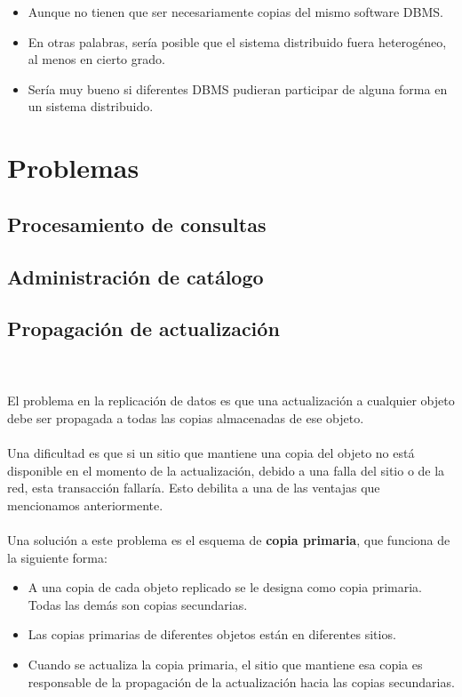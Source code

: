 \documentclass[10pt,a4paper,oneside]{article}
\begin{document}
\begin {itemize}
\begin{itemize}
\item Aunque no tienen que ser necesariamente copias del mismo software DBMS.
\item En otras palabras, ser\'ia posible que el sistema distribuido fuera heterog\'eneo, al menos en cierto grado.
\item Ser\'ia muy bueno si diferentes DBMS pudieran participar de alguna forma en un sistema distribuido. 
\end{itemize}


\section{Problemas}
\subsection{Procesamiento de consultas}
\subsection{Administraci\'on de cat\'alogo}


\subsection{Propagaci\'on de actualizaci\'on}
\\\\El problema en la replicaci\'on de datos es que una actualizaci\'on a cualquier objeto debe ser propagada a todas las copias almacenadas de ese objeto. 
\\\\Una dificultad es que si un sitio que mantiene una copia del objeto no est\'a disponible en el momento de la actualizaci\'on, debido a una falla del sitio o de la red, esta transacci\'on fallar\'ia.  Esto debilita a una de las ventajas que mencionamos anteriormente.
\\\\Una soluci\'on a este problema es el esquema de {\bf copia primaria}, que funciona de la siguiente forma:
\begin {itemize}
\item A una copia de cada objeto replicado se le designa como copia primaria. Todas las dem\'as
son copias secundarias.
\item Las copias primarias de diferentes objetos est\'an en diferentes sitios.
\item Cuando se actualiza la copia primaria, el sitio que mantiene esa copia es responsable de la propagaci\'on de la actualizaci\'on hacia las copias secundarias. 
\end {itemize}



\end{itemize}
\end{document}
